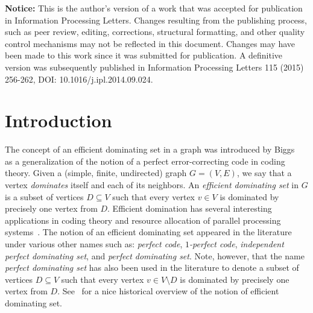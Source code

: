 \documentclass[]{elsarticle}
\begin{document}
\noindent
\textbf{Notice:} This is the author's version of a work that was accepted for publication in Information Processing Letters. Changes resulting from the publishing process, such as peer review, editing, corrections, structural formatting, and other quality control mechanisms may not be reflected in this document. Changes may have been made to this work since it was submitted for publication. A definitive version was subsequently published in Information Processing Letters 115 (2015) 256-262, DOI: 10.1016/j.ipl.2014.09.024.

\section{Introduction}

The concept of an efficient dominating set in a graph was introduced by Biggs~\cite{Biggs} as a generalization of the notion of a perfect error-correcting code in coding theory. Given a (simple, finite, undirected) graph $G=(V,E)$, we say that a vertex \emph{dominates} itself and each of its neighbors. 
An \emph{efficient dominating set} in $G$ is a subset of vertices $D\subseteq V$ such that every vertex $v \in V$ is dominated by precisely one vertex from $D$. 
Efficient domination has several interesting applications in coding theory and resource allocation of parallel processing systems~\cite{Biggs, LLT97, LS90}. The notion of an efficient dominating set appeared in the literature under various other names such as: \emph{perfect code}, \emph{$1$-perfect code}, \emph{independent perfect dominating set}, and \emph{perfect dominating set}. 
Note, however, that the name \emph{perfect dominating set} has also been used in the literature to denote a subset of vertices $D\subseteq V$ such that every vertex $v \in V\setminus D$ is dominated by precisely one vertex from $D$. 
See~\cite{LT02} for a nice historical overview of the notion of efficient dominating set.
\end{document}
